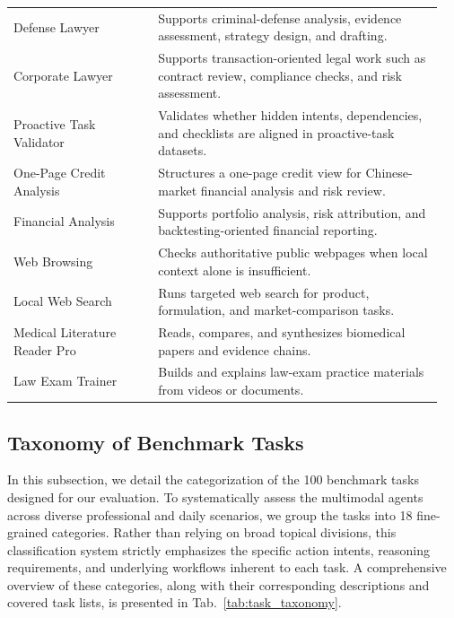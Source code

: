 \documentclass{llmxive}
\begin{document}
\begin{longtable}{@{}p{0.32\linewidth}p{0.63\linewidth}@{}}
Defense Lawyer & Supports criminal-defense analysis, evidence assessment, strategy design, and drafting. \\
Corporate Lawyer & Supports transaction-oriented legal work such as contract review, compliance checks, and risk assessment. \\
Proactive Task Validator & Validates whether hidden intents, dependencies, and checklists are aligned in proactive-task datasets. \\
One-Page Credit Analysis & Structures a one-page credit view for Chinese-market financial analysis and risk review. \\
Financial Analysis & Supports portfolio analysis, risk attribution, and backtesting-oriented financial reporting. \\
Web Browsing & Checks authoritative public webpages when local context alone is insufficient. \\
Local Web Search & Runs targeted web search for product, formulation, and market-comparison tasks. \\
Medical Literature Reader Pro & Reads, compares, and synthesizes biomedical papers and evidence chains. \\
Law Exam Trainer & Builds and explains law-exam practice materials from videos or documents. \\

\end{longtable}
\endgroup
























\subsection{Taxonomy of Benchmark Tasks} %
\label{app:taxonomy_of_benchmark_tasks}

In this subsection, we detail the categorization of the 100 benchmark tasks designed for our evaluation. To systematically assess the multimodal agents across diverse professional and daily scenarios, we group the tasks into 18 fine-grained categories. Rather than relying on broad topical divisions, this classification system strictly emphasizes the specific action intents, reasoning requirements, and underlying workflows inherent to each task. A comprehensive overview of these categories, along with their corresponding descriptions and covered task lists, is presented in Tab.~\ref{tab:task_taxonomy}.
\end{document}
